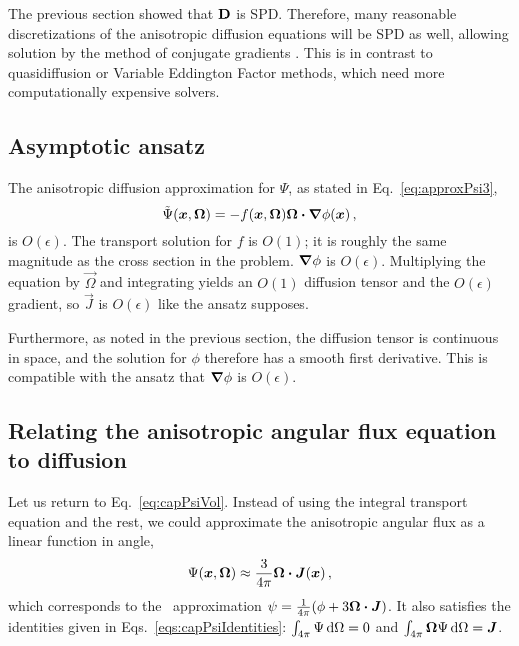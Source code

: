 The previous section showed that $\mathbf{D}$ is SPD. Therefore, many reasonable
discretizations of the anisotropic diffusion equations will be SPD as well,
allowing
solution by the method of conjugate gradients \cite{Tre1997}. This is in
contrast to quasidiffusion or Variable Eddington Factor methods, which need
more computationally expensive solvers.

\subsection{Asymptotic ansatz}
The anisotropic diffusion approximation for $\Psi$, as stated in
Eq.~\eqref{eq:approxPsi3},
\begin{equation*}
\tilde\Psi(\bm{x}, \bm{\Omega}) = - f(\bm{x}, \bm{\Omega})
\bm{\Omega}\bm{\cdot} \bm{\nabla} \phi(\bm{x})\,,
\end{equation*}
is $O(\epsilon)$. The transport solution for $f$ is $O(1)$; it is roughly the
same magnitude as the cross section in the problem. $\bm{\nabla} \phi$ is $O(\epsilon)$.
Multiplying the equation by $\vec{\Omega}$ and integrating yields an $O(1)$
diffusion tensor and the $O(\epsilon)$ gradient, so $\vec{J}$ is $O(\epsilon)$
like the ansatz supposes.

Furthermore, as noted in the previous section, the diffusion tensor is
continuous in space, and the solution for $\phi$ therefore has a smooth first
derivative. This is compatible with the ansatz that $\bm{\nabla} \phi$
is $O(\epsilon)$.

\subsection{Relating the anisotropic angular flux equation to
diffusion}\label{sec:adDiscDiff}
Let us return to Eq.~\eqref{eq:capPsiVol}. Instead of using the integral
transport equation and the rest, we could approximate the anisotropic angular flux
as a linear function in angle,
\begin{equation*}
  \Psi(\bm{x}, \bm{\Omega}) \approx \frac{3}{4\pi} \bm{\Omega} \bm{\cdot}
  \bm{J}(\bm{x})\,,
\end{equation*}
which corresponds to the \Pone\ approximation $\psi= \frac{1}{4\pi} (\phi +
3\bm{\Omega} \bm{\cdot} \bm{J})$. It also satisfies the identities given in
Eqs.~\eqref{eqs:capPsiIdentities}: $\int_{4\pi} \Psi \mathop{}\!\mathrm{d}\Omega = 0$ and
$\int_{4\pi} \bm{\Omega} \Psi \mathop{}\!\mathrm{d}\Omega = \bm{J}$.

